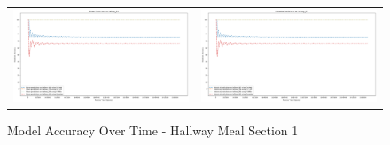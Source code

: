 \begin{figure}
  \begin{tabular}{cc}
    {\includegraphics[width = 3in]{images/results/Future_Predictions_on_hallway_M1.png}} &
    {\includegraphics[width = 3in]{images/results/Historical_Predictions_on_hallway_M1.png}} \\
  \end{tabular}
  \caption{Model Accuracy Over Time - Hallway Meal Section 1}
\end{figure}



